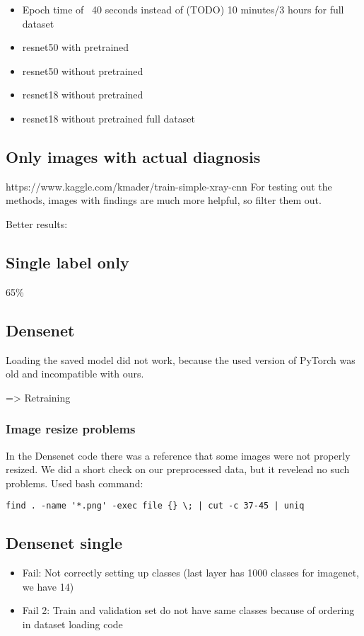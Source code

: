 \begin{itemize}
    \item Epoch time of ~40 seconds instead of (TODO) 10 minutes/3 hours for full dataset
    \item resnet50 with pretrained
    \item resnet50 without pretrained
    \item resnet18 without pretrained
    \item resnet18 without pretrained full dataset
\end{itemize}

\subsection{Only images with actual diagnosis}
https://www.kaggle.com/kmader/train-simple-xray-cnn 
For testing out the methods, images with findings are much more helpful, so filter them out.

Better results:


\subsection{Single label only}
65\%

\subsection{Densenet}

Loading the saved model did not work, because the used version of PyTorch was old and incompatible with ours.

=> Retraining

\subsubsection{Image resize problems}
In the Densenet code there was a reference that some images were not properly resized. We did a short check on our preprocessed data, but it revelead no such problems. Used bash command:

\begin{verbatim}
find . -name '*.png' -exec file {} \; | cut -c 37-45 | uniq
\end{verbatim}

\subsection{Densenet single}
\begin{itemize}
    \item Fail: Not correctly setting up classes (last layer has 1000 classes for imagenet, we have 14)
    \item Fail 2: Train and validation set do not have same classes because of ordering in dataset loading code
\end{itemize}

